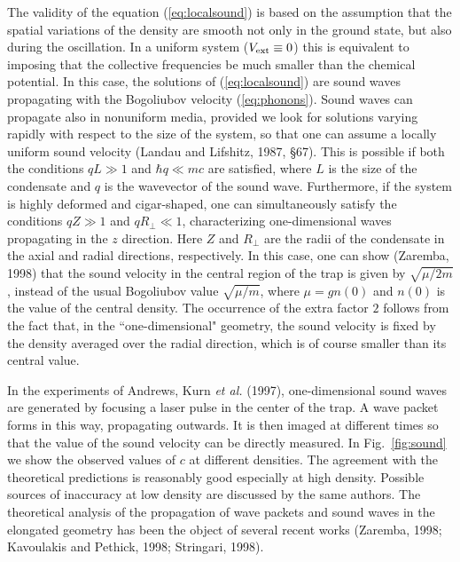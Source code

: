The validity of the equation (\ref{eq:localsound}) is based
on the assumption that the  spatial variations of the density are smooth
not only in the ground  state, but also during the oscillation. In a uniform
system ($V_{\rm ext}\equiv 0$) this is equivalent to 
imposing that the collective
frequencies be much smaller than the chemical potential.
In this case, the solutions of (\ref{eq:localsound}) are sound  waves
propagating with the Bogoliubov velocity (\ref{eq:phonons}).
Sound waves can propagate also in  nonuniform media, provided we
look for solutions varying   rapidly with respect to the size of the
system, so that  one  can assume a locally uniform sound velocity (Landau
and Lifshitz, 1987, \S 67). This is  possible if both
the conditions  $qL \gg 1$ and $\hbar q \ll mc$ are satisfied, where $L$ is
the size of  the condensate and $q$ is the wavevector of the sound wave.
Furthermore, if the system is highly deformed and cigar-shaped,
one can simultaneously
satisfy the conditions $qZ \gg 1$ and $qR_{\perp} \ll 1$, characterizing
one-dimensional waves propagating in the $z$ direction. Here $Z$ and
$R_{\perp}$ are the radii of the condensate in the axial and radial
directions, respectively. In this case, one can show (Zaremba, 1998) 
that the sound
velocity in the central region of the trap is given by $\sqrt{\mu/2m}$,
instead of the usual Bogoliubov value   $\sqrt{\mu/m}$, where $\mu =
g n(0)$ and $n(0)$ is the value of the central density. The occurrence
of the extra factor $2$ follows from the fact that, in the
``one-dimensional" geometry, the sound velocity
is fixed by the density averaged over  the radial direction, which is
of course smaller than its central value.

In the experiments of Andrews, Kurn {\it et al.} (1997), one-dimensional 
sound waves are generated by focusing a laser pulse in  the center of the 
trap. A wave packet forms in this way, propagating outwards. It is then
imaged at different times so that the value of the sound velocity 
can be directly  measured.  In Fig.~\ref{fig:sound} we show the observed 
values of $c$ at different densities.  The agreement with the theoretical
predictions is reasonably good especially at high density. Possible 
sources of inaccuracy at low density are discussed by the same authors.  
The theoretical analysis of the
propagation of wave packets and sound waves in the elongated geometry has
been the object of several recent works (Zaremba, 1998; Kavoulakis and 
Pethick, 1998; Stringari, 1998).

